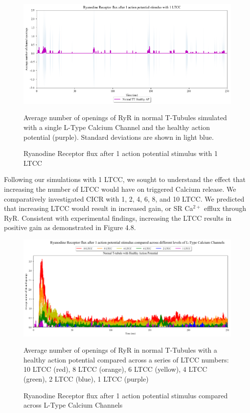 \documentclass[12pt]{ucsddissertation}
\begin{document}
\setcounter{figure}{6}
\begin{figure}
	\includegraphics[scale=0.61]{RyRflux_1AP_1LTCC.png}
	\caption{Ryanodine Receptor flux after 1 action potential stimulus with 1 LTCC} Average number of openings of RyR in normal T-Tubules simulated with a single L-Type Calcium Channel and the healthy action potential (purple). Standard deviations are shown in light blue.
\label{fig:RyR flux 1 LTCC} 
\end{figure}

Following our simulations with 1 LTCC, we sought to understand the effect that increasing the number of LTCC would have on triggered Calcium release. We comparatively investigated CICR with 1, 2, 4, 6, 8, and 10 LTCC. We predicted that increasing LTCC would result in increased gain, or SR Ca$^{2+}$ efflux through RyR. Consistent with experimental findings, \cite{Cannell1995} increasing the LTCC results in positive gain as demonstrated in Figure 4.8.

\setcounter{figure}{7}
\begin{figure}
\centering
	\includegraphics[scale=0.52]{RyRflux_1AP_LTCC_hn_Comparison.png}
	\caption{Ryanodine Receptor flux after 1 action potential stimulus compared across L-Type Calcium Channels} Average number of openings of RyR in normal T-Tubules with a healthy action potential compared across a series of LTCC numbers: 10 LTCC (red), 8 LTCC (orange), 6 LTCC (yellow), 4 LTCC (green), 2 LTCC (blue), 1 LTCC (purple)
\label{fig:hnhd 1 AP LTCC RyR } 
\end{figure}
\end{document}

